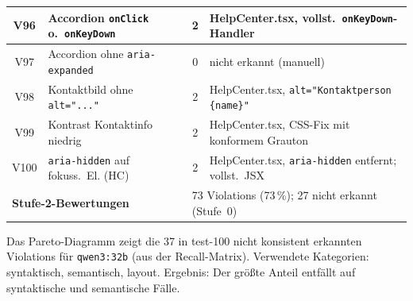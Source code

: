 \begin{longtable}{|c|p{5.0cm}|c|p{5.4cm}|}
V96  & Accordion \texttt{onClick} o.\ \texttt{onKeyDown} & 2 & HelpCenter.tsx, vollst.\ \texttt{onKeyDown}-Handler \\ \hline
V97  & Accordion ohne \texttt{aria-expanded}        & 0 & nicht erkannt (manuell) \\ \hline
V98  & Kontaktbild ohne \texttt{alt="..."}                & 2 & HelpCenter.tsx, \texttt{alt="Kontaktperson \{name\}"} \\ \hline
V99  & Kontrast Kontaktinfo niedrig                 & 2 & HelpCenter.tsx, \ac{CSS}-Fix mit konformem Grauton \\ \hline
V100 & \texttt{aria-hidden} auf fokuss.\ El. (HC)   & 2 & HelpCenter.tsx, \texttt{aria-hidden} entfernt; vollst.\ \ac{JSX} \\ \hline
\multicolumn{2}{|l|}{\textbf{Stufe-2-Bewertungen}} & \multicolumn{2}{l|}{73 Violations (73\,\%); 27 nicht erkannt (Stufe~0)} \\
\hline
\end{longtable}



\clearpage

\label{app:graph_pareto_demo}

\noindent Das Pareto-Diagramm zeigt die 37 in test-100 nicht konsistent erkannten Violations für \texttt{qwen3:32b} (aus der Recall-Matrix). Verwendete Kategorien: syntaktisch, semantisch, layout. Ergebnis: Der größte Anteil entfällt auf syntaktische und semantische Fälle.


